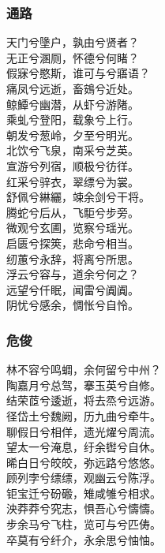 \documentclass[]{article}
\begin{document}
\hypertarget{header-n3038}{%
\subsubsection{通路}\label{header-n3038}}

天门兮墬户，孰由兮贤者？\\
无正兮溷厕，怀德兮何睹？\\
假寐兮愍斯，谁可与兮寤语？\\
痛凤兮远逝，畜鴳兮近处。\\
鲸鱏兮幽潜，从虾兮游陼。\\
乘虬兮登阳，载象兮上行。\\
朝发兮葱岭，夕至兮明光。\\
北饮兮飞泉，南采兮芝英。\\
宣游兮列宿，顺极兮彷徉。\\
红采兮骍衣，翠缥兮为裳。\\
舒佩兮綝纚，竦余剑兮干将。\\
腾蛇兮后从，飞駏兮步旁。\\
微观兮玄圃，览察兮瑶光。\\
启匮兮探筴，悲命兮相当。\\
纫蕙兮永辞，将离兮所思。\\
浮云兮容与，道余兮何之？\\
远望兮仟眠，闻雷兮阗阗。\\
阴忧兮感余，惆怅兮自怜。

\hypertarget{header-n3043}{%
\subsubsection{危俊}\label{header-n3043}}

林不容兮鸣蜩，余何留兮中州？\\
陶嘉月兮总驾，搴玉英兮自修。\\
结荣茝兮逶逝，将去烝兮远游。\\
径岱土兮魏阙，历九曲兮牵牛。\\
聊假日兮相佯，遗光燿兮周流。\\
望太一兮淹息，纡余辔兮自休。\\
晞白日兮皎皎，弥远路兮悠悠。\\
顾列孛兮缥缥，观幽云兮陈浮。\\
钜宝迁兮砏磤，雉咸雊兮相求。\\
泱莽莽兮究志，惧吾心兮懤懤。\\
步余马兮飞柱，览可与兮匹俦。\\
卒莫有兮纤介，永余思兮怞怞。
\end{document}
